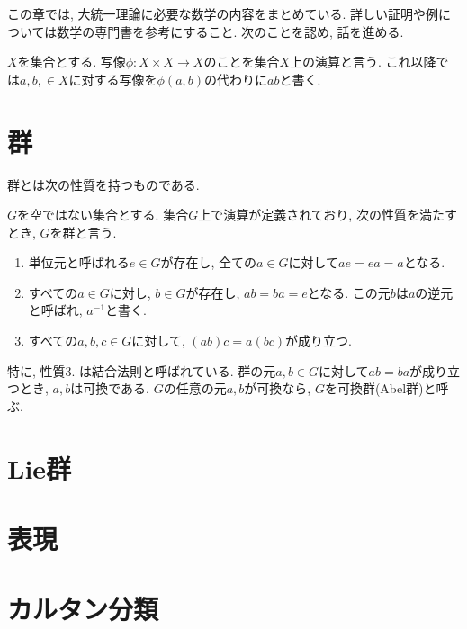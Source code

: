 %
%
 この章では, 大統一理論に必要な数学の内容をまとめている.
 詳しい証明や例については数学の専門書を参考にすること.
 次のことを認め, 話を進める.
 
 $X$を集合とする.
 写像$\phi: X\times X \rightarrow X$のことを集合$X$上の演算と言う.
 これ以降では$a,b,\in X$に対する写像を$\phi(a, b)$の代わりに$ab$と書く.
\section{群}
群とは次の性質を持つものである.
\begin{dfn}[群]
  $G$を空ではない集合とする. 集合$G$上で演算が定義されており, 次の性質を満たすとき, $G$を群と言う.
  \begin{enumerate}
    \item 単位元と呼ばれる$e\in G$が存在し, 全ての$a\in G$に対して$ae=ea=a$となる.
    \item すべての$a\in G$に対し, $b\in G$が存在し, $ab=ba=e$となる. この元$b$は$a$の逆元と呼ばれ, $a^{-1}$と書く.
    \item すべての$a, b, c \in G$に対して, $(ab)c=a(bc)$が成り立つ.
  \end{enumerate}
\end{dfn}
特に, 性質3. は結合法則と呼ばれている.
群の元$a, b\in G$に対して$ab=ba$が成り立つとき, $a, b$は可換である.
$G$の任意の元$a, b$が可換なら, $G$を可換群(Abel群)と呼ぶ.

\section{Lie群}
\section{表現}
\section{カルタン分類}



